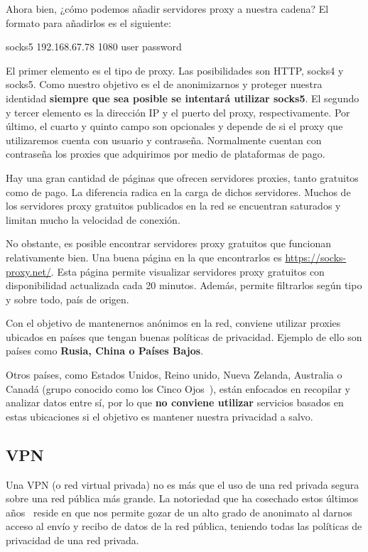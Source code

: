 Ahora bien, ¿cómo podemos añadir servidores proxy a nuestra cadena?
El formato para añadirlos es el siguiente:


{\selectfont 
	socks5  192.168.67.78   1080    user   password
}

El primer elemento es el tipo de proxy. Las posibilidades son HTTP, socks4 y socks5. Como nuestro objetivo es el de anonimizarnos y proteger nuestra identidad \textbf{siempre que sea posible se intentará utilizar socks5}.
El segundo y tercer elemento es la dirección IP y el puerto del proxy, respectivamente. 
Por último, el cuarto y quinto campo son opcionales y depende de si el proxy que utilizaremos cuenta con usuario y contraseña. Normalmente cuentan con contraseña los proxies que adquirimos por medio de plataformas de pago.

Hay una gran cantidad de páginas que ofrecen servidores proxies, tanto gratuitos como de pago. La diferencia radica en la carga de dichos servidores. Muchos de los servidores proxy gratuitos publicados en la red se encuentran saturados y limitan mucho la velocidad de conexión.

No obstante, es posible encontrar servidores proxy gratuitos que funcionan relativamente bien. Una buena página en la que encontrarlos es \url{https://socks-proxy.net/}. 
Esta página permite visualizar servidores proxy gratuitos con disponibilidad actualizada cada 20 minutos. Además, permite filtrarlos según tipo y sobre todo, país de origen.

Con el objetivo de mantenernos anónimos en la red, conviene utilizar proxies ubicados en países que tengan buenas políticas de privacidad. Ejemplo de ello son países como \textbf{Rusia, China o Países Bajos}. 

Otros países, como Estados Unidos, Reino unido, Nueva Zelanda, Australia o Canadá \label{key}(grupo conocido como los Cinco Ojos~\cite{article:politicas}), están enfocados en recopilar y analizar datos entre sí, por lo que \textbf{no conviene utilizar} servicios basados en estas ubicaciones si el objetivo es mantener nuestra privacidad a salvo.  

\subsection{VPN}

Una VPN (o red virtual privada) no es más que el uso de una red privada segura sobre una red pública más grande. 
La notoriedad que ha cosechado estos últimos años~\cite{article:notoriedad} reside en que nos permite gozar de un alto grado de anonimato al darnos acceso al envío y recibo de datos de la red pública, teniendo todas las políticas de privacidad de una red privada.

